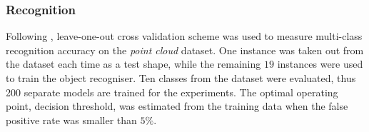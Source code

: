 \subsubsection{Recognition}
Following \cite{Pham2011}, leave-one-out cross validation scheme was used to measure multi-class recognition accuracy on the \emph{point cloud} dataset. One instance was taken out from the dataset each time as a test shape, while the remaining $19$ instances were used to train the object recogniser. Ten classes from the dataset were evaluated, thus 200 separate models are trained for the experiments. The optimal operating point, \ie decision threshold, was estimated from the training data when the false positive rate was smaller than $5\%$.


